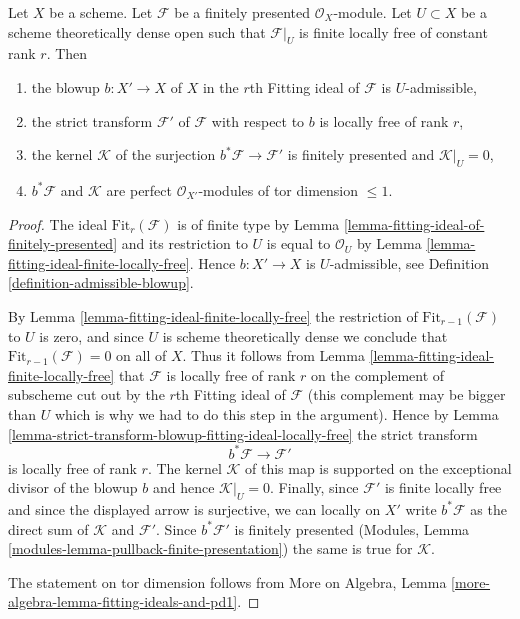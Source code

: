 \begin{lemma}
\label{lemma-blowup-fitting-ideal}
Let $X$ be a scheme. Let $\mathcal{F}$ be a finitely presented
$\mathcal{O}_X$-module. Let $U \subset X$ be a scheme theoretically
dense open such that $\mathcal{F}|_U$ is finite locally free of
constant rank $r$. Then
\begin{enumerate}
\item the blowup $b : X' \to X$ of $X$ in the $r$th Fitting
ideal of $\mathcal{F}$ is $U$-admissible,
\item the strict transform $\mathcal{F}'$ of $\mathcal{F}$
with respect to $b$ is locally free of rank $r$,
\item the kernel $\mathcal{K}$ of the surjection
$b^*\mathcal{F} \to \mathcal{F}'$ is
finitely presented and $\mathcal{K}|_U = 0$,
\item $b^*\mathcal{F}$ and $\mathcal{K}$ are perfect
$\mathcal{O}_{X'}$-modules of tor dimension $\leq 1$.
\end{enumerate}
\end{lemma}

\begin{proof}
The ideal $\text{Fit}_r(\mathcal{F})$ is of finite type
by Lemma \ref{lemma-fitting-ideal-of-finitely-presented}
and its restriction to $U$ is equal to $\mathcal{O}_U$ by
Lemma \ref{lemma-fitting-ideal-finite-locally-free}.
Hence $b : X' \to X$ is $U$-admissible, see
Definition \ref{definition-admissible-blowup}.

\medskip\noindent
By Lemma \ref{lemma-fitting-ideal-finite-locally-free}
the restriction of $\text{Fit}_{r - 1}(\mathcal{F})$
to $U$ is zero, and since $U$ is scheme theoretically dense
we conclude that $\text{Fit}_{r - 1}(\mathcal{F}) = 0$
on all of $X$. Thus it follows from
Lemma \ref{lemma-fitting-ideal-finite-locally-free}
that $\mathcal{F}$ is locally free of rank $r$
on the complement of subscheme cut out by the $r$th
Fitting ideal of $\mathcal{F}$ (this complement may
be bigger than $U$ which is why we had to do this step
in the argument). Hence by
Lemma \ref{lemma-strict-transform-blowup-fitting-ideal-locally-free}
the strict transform
$$
b^*\mathcal{F} \longrightarrow \mathcal{F}'
$$
is locally free of rank $r$. The kernel $\mathcal{K}$
of this map is supported on the exceptional divisor
of the blowup $b$ and hence $\mathcal{K}|_U = 0$.
Finally, since $\mathcal{F}'$ is finite locally free
and since the displayed arrow is surjective, we can
locally on $X'$ write $b^*\mathcal{F}$ as the
direct sum of $\mathcal{K}$ and $\mathcal{F}'$.
Since $b^*\mathcal{F}'$ is finitely presented
(Modules, Lemma \ref{modules-lemma-pullback-finite-presentation})
the same is true for $\mathcal{K}$.

\medskip\noindent
The statement on tor dimension follows from
More on Algebra, Lemma \ref{more-algebra-lemma-fitting-ideals-and-pd1}.
\end{proof}





